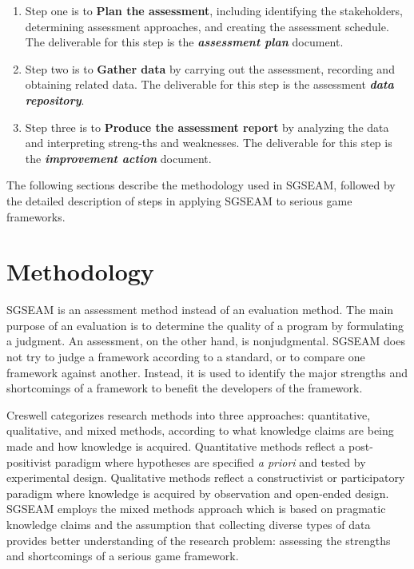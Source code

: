 \begin{enumerate}
\item Step one is to {\bf Plan the assessment}, including
 identifying the stakeholders, determining assessment approaches, and creating the assessment schedule. 
 The deliverable for this step is the \textbf{\textit{assessment
     plan}} document. 

\item Step two is to {\bf Gather data} by carrying out 
 the assessment, recording and obtaining related data. The deliverable for this step is the 
 assessment \textbf{\textit{data repository}}. 

\item Step three is to {\bf Produce the assessment report} by analyzing 
 the data and interpreting streng-ths and weaknesses. The deliverable
 for this step is the \textbf{\textit{improvement action}} document.

\end{enumerate}
 
The following sections describe the methodology used in SGSEAM, followed by the detailed
description of steps in applying SGSEAM to serious game frameworks.

\section{Methodology}

SGSEAM is an assessment method instead of an evaluation method. The main purpose 
of an evaluation is to determine the quality of a program by formulating a judgment. An assessment, on 
the other hand, is nonjudgmental. SGSEAM does not try to judge a framework according to a 
standard, or to compare one framework against another. Instead, it is used to identify the major 
strengths and shortcomings of a framework to benefit  the developers of the framework.

Creswell \cite{creswell2003} categorizes research methods into three approaches:
quantitative, qualitative, and mixed methods, according to what knowledge claims are being made
and how knowledge is acquired. Quantitative methods reflect a post-positivist paradigm where
hypotheses are specified {\em a priori} and tested by experimental design. Qualitative methods
reflect a constructivist or participatory paradigm where knowledge is acquired by
observation and open-ended design. SGSEAM employs the mixed methods approach which is based on
pragmatic knowledge claims and the assumption that collecting diverse types of data provides better
understanding of the research problem: assessing the strengths and shortcomings of a serious game
framework.

